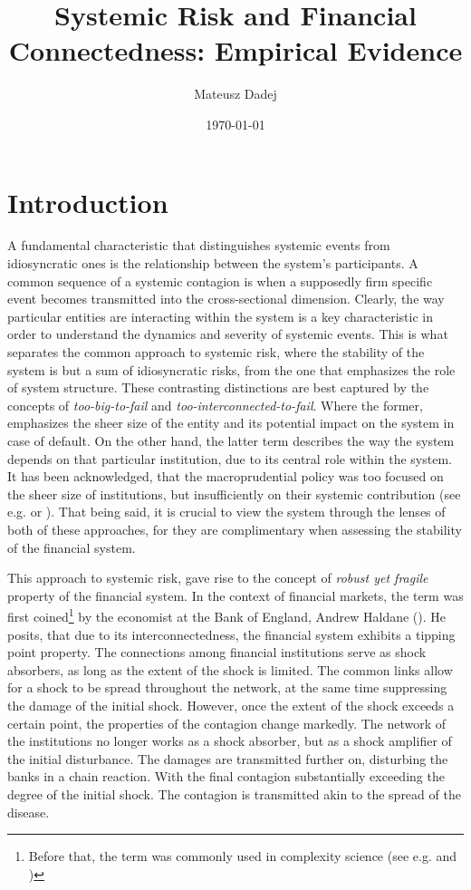 \documentclass[12pt]{article}
\title{Systemic Risk and Financial Connectedness: Empirical Evidence}
\author{Mateusz Dadej}
\date{\today}
\begin{document}
\maketitle

\section{Introduction}

A fundamental characteristic that distinguishes systemic events from idiosyncratic ones is the relationship between the system's participants. A common sequence of a systemic contagion is when a supposedly firm specific event becomes transmitted into the cross-sectional dimension. Clearly, the way particular entities are interacting within the system is a key characteristic in order to understand the dynamics and severity of systemic events. This is what separates the common approach to systemic risk, where the stability of the system is but a sum of idiosyncratic risks, from the one that emphasizes the role of system structure. These contrasting distinctions are best captured by the concepts of \textit{too-big-to-fail} and \textit{too-interconnected-to-fail}. Where the former, emphasizes the sheer size of the entity and its potential impact on the system in case of default. On the other hand, the latter term describes the way the system depends on that particular institution, due to its central role within the system. It has been acknowledged, that the macroprudential policy was too focused on the sheer size of institutions, but insufficiently on their systemic contribution (see e.g. \cite{bernanke09} or \cite{rajan09}). That being said, it is crucial to view the system through the lenses of both of these approaches, for they are complimentary when assessing the stability of the financial system.

This approach to systemic risk, gave rise to the concept of \textit{robust yet fragile} property of the financial system. In the context of financial markets, the term was first coined\footnote{Before that, the term was commonly used in complexity science (see e.g. \cite{doyle05} and \cite{carlson02})} by the economist at the Bank of England, Andrew Haldane (\cite{haldane13}). He posits, that due to its interconnectedness, the financial system exhibits a tipping point property. The connections among financial institutions serve as shock absorbers, as long as the extent of the shock is limited. The common links allow for a shock to be spread throughout the network, at the same time suppressing the damage of the initial shock. However, once the extent of the shock exceeds a certain point, the properties of the contagion change markedly. The network of the institutions no longer works as a shock absorber, but as a shock amplifier of the initial disturbance. The damages are transmitted further on, disturbing the banks in a chain reaction. With the final contagion substantially exceeding the degree of the initial shock. The contagion is transmitted akin to the spread of the disease. 
\end{document}
